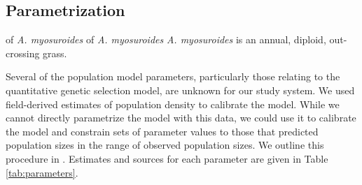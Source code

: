 \documentclass[10pt,letterpaper]{article}
\begin{document}
\subsection*{Parametrization}
of \textit{A. myosuroides}
of \textit{A. myosuroides} 
\textit{A. myosuroides} is an annual, diploid, out-crossing grass. 

Several of the population model parameters, particularly those relating to the quantitative genetic selection model, are unknown for our study system. We used field-derived estimates of population density to calibrate the model. While we cannot directly parametrize the model with this data, we could use it to calibrate the model and constrain sets of parameter values to those that predicted population sizes in the range of observed population sizes. We outline this procedure in . Estimates and sources for each parameter are given in Table \ref{tab:parameters}.          
\end{document}
